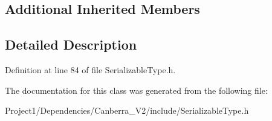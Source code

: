 \subsection*{Additional Inherited Members}


\subsection{Detailed Description}


Definition at line 84 of file Serializable\+Type.\+h.



The documentation for this class was generated from the following file\+:\begin{DoxyCompactItemize}
\item 
Project1/\+Dependencies/\+Canberra\+\_\+\+V2/include/Serializable\+Type.\+h\end{DoxyCompactItemize}
